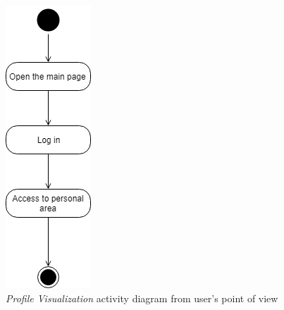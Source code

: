 \begin{figure}[H]
\begin{center}
  \includegraphics{img/activity/ProfileVisualization.png}
  \hspace{0.05\linewidth}
  \centering
  \caption{\textit{Profile Visualization} activity diagram from user's point of view}
  \label{img:profileVisualizationActivityDiagram}
\end{center}
\end{figure}

